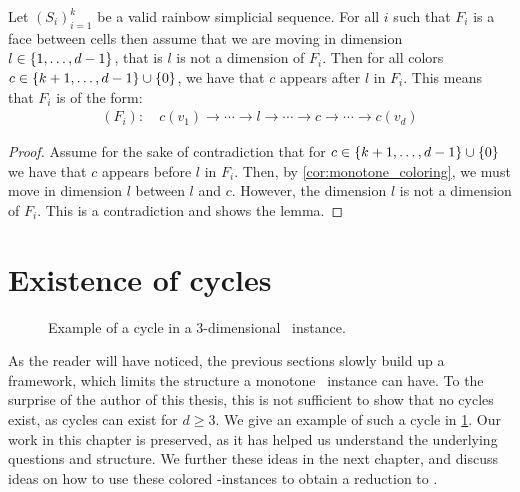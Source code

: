 \begin{lemma}\label{lem:ordering_of_vertices_in_transition_faces}
	Let ${\left(S_i\right)}_{i=1}^k$ be a valid rainbow simplicial sequence. For all $i$ such that $F_i$ is a face between cells then assume that we are moving in dimension $l \in \left\{1, \dots, d-1\right\}$, that is $l$ is not a dimension of $F_i$. Then for all colors $c \in \left\{k+1, \dots, d-1\right\} \cup \left\{0\right\}$, we have that $c$ appears after $l$ in $F_i$. This means that $F_i$ is of the form:
	\begin{align*}
		(F_i): \quad c(v_1) \xrightarrow{} \cdots \xrightarrow{} l \xrightarrow{} \cdots \xrightarrow{} c \xrightarrow{} \cdots \xrightarrow{} c(v_d)
	\end{align*}
\end{lemma}
\begin{proof}
	Assume for the sake of contradiction that for $c \in \left\{k+1, \dots, d-1\right\} \cup \left\{0\right\}$ we have that $c$ appears before $l$ in $F_i$. Then, by \cref{cor:monotone_coloring}, we must move in dimension $l$ between $l$ and $c$. However, the dimension $l$ is not a dimension of $F_i$. This is a contradiction and shows the lemma.
\end{proof}

\section{Existence of cycles}\label{sec:existence_of_cycles}

\begin{figure}
	\centering
	\caption[Example of a 3D cycle]{Example of a cycle in a 3-dimensional \Tarskistar\ instance.}\label{fig:cycle_example}
\end{figure}

As the reader will have noticed, the previous sections slowly build up a framework, which limits the structure a monotone \Tarski\ instance can have. To the surprise of the author of this thesis, this is not sufficient to show that no cycles exist, as cycles can exist for $d \geq 3$. We give an example of such a cycle in \cref{fig:cycle_example}. Our work in this chapter is preserved, as it has helped us understand the underlying questions and structure. We further these ideas in the next chapter, and discuss ideas on how to use these colored \Tarskistar-instances to obtain a reduction to \EndOfPotentialLine\@.

